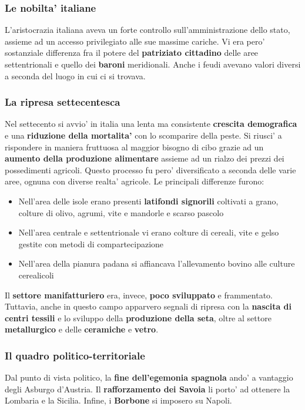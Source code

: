 \documentclass{article}
\begin{document}
{{    \subsubsection{Le nobilta' italiane} %
    L'aristocrazia italiana aveva un forte controllo sull'amministrazione dello stato, assieme ad un accesso privilegiato alle sue massime cariche. Vi era pero' sostanziale differenza fra il potere del \textbf{patriziato cittadino} delle aree settentrionali e quello dei \textbf{baroni} meridionali. Anche i feudi avevano valori diversi a seconda del luogo in cui ci si trovava.

    \subsubsection{La ripresa settecentesca} %
    Nel settecento si avvio' in italia una lenta ma consistente \textbf{crescita demografica} e una \textbf{riduzione della mortalita'} con lo scomparire della peste. Si riusci' a rispondere in maniera fruttuosa al maggior bisogno di cibo grazie ad un \textbf{aumento della produzione alimentare} assieme ad un rialzo dei prezzi dei possedimenti agricoli. Questo processo fu pero' diversificato a seconda delle varie aree, ognuna con diverse realta' agricole. Le principali differenze furono:

    \begin{itemize}
      \item Nell'area delle isole erano presenti \textbf{latifondi signorili} coltivati a grano, colture di olivo, agrumi, vite e mandorle e scarso pascolo
      \item Nell'area centrale e settentrionale vi erano colture di cereali, vite e gelso gestite con metodi di compartecipazione
      \item  Nell'area della pianura padana si affiancava l'allevamento bovino alle culture cerealicoli
    \end{itemize}

    Il \textbf{settore manifatturiero} era, invece, \textbf{poco sviluppato} e frammentato. Tuttavia, anche in questo campo apparvero segnali di ripresa con la \textbf{nascita di centri tessili} e lo sviluppo della \textbf{produzione della seta}, oltre al settore \textbf{metallurgico} e delle \textbf{ceramiche} e \textbf{vetro}.

    \subsubsection{Il quadro politico-territoriale} %
    Dal punto di vista politico, la \textbf{fine dell'egemonia spagnola} ando' a vantaggio degli Asburgo d'Austria. Il \textbf{rafforzamento dei Savoia} li porto' ad ottenere la Lombaria e la Sicilia. Infine, i \textbf{Borbone} si imposero su Napoli.

}}
\end{document}
